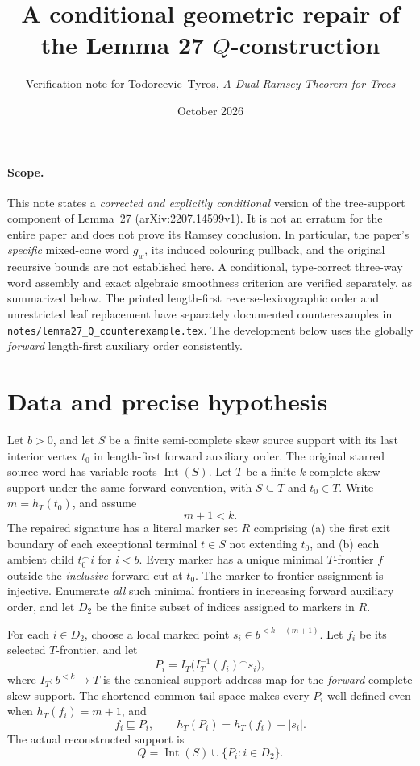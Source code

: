 \documentclass[11pt]{article}
\title{A conditional geometric repair of the Lemma 27 \(Q\)-construction}
\author{Verification note for Todorcevic--Tyros,
\emph{A Dual Ramsey Theorem for Trees}}
\date{October 2026}
\newcommand{\Int}{\operatorname{Int}}
\newcommand{\htT}{h_T}
\newcommand{\pre}{\sqsubseteq}
\newcommand{\len}[1]{\lvert #1\rvert}
\begin{document}
\maketitle

\paragraph{Scope.}
This note states a \emph{corrected and explicitly conditional}
version of the tree-support component of Lemma~27
(arXiv:2207.14599v1).
It is not an erratum for the entire paper and does not
prove its Ramsey conclusion. In particular, the paper's
\emph{specific} mixed-cone word \(g_w\), its induced
colouring pullback, and the original recursive bounds
are not established here. A conditional, type-correct
three-way word assembly and exact algebraic smoothness
criterion are verified separately, as summarized below.
The printed length-first reverse-lexicographic order and
unrestricted leaf replacement have separately documented
counterexamples in
\texttt{notes/lemma27\_Q\_counterexample.tex}.
The development below uses the globally \emph{forward}
length-first auxiliary order consistently.

\section*{Data and precise hypothesis}

Let \(b>0\), and let \(S\) be a finite semi-complete skew
source support with its last interior vertex \(t_0\)
in length-first forward auxiliary order.
The original starred source word has variable roots
\(\Int(S)\).
Let \(T\) be a finite \(k\)-complete skew support under
the same forward convention, with \(S\subseteq T\) and
\(t_0\in T\).
Write \(m=\htT(t_0)\), and assume
\begin{equation}\label{eq:early}
 m+1<k.
\end{equation}
The repaired signature has a literal marker set \(R\)
comprising (a) the first exit boundary of each exceptional
terminal \(t\in S\) not extending \(t_0\), and (b) each
ambient child \(t_0^\frown i\) for \(i<b\).
Every marker has a unique minimal \(T\)-frontier \(f\)
outside the \emph{inclusive} forward cut at \(t_0\).
The marker-to-frontier assignment is injective.
Enumerate \emph{all} such minimal frontiers in increasing
forward auxiliary order, and let \(D_2\) be the finite
subset of indices assigned to markers in \(R\).

For each \(i\in D_2\), choose a local marked point
\(s_i\in b^{<k-(m+1)}\). Let \(f_i\) be its selected
\(T\)-frontier, and let
\[
 P_i=I_T\bigl(I_T^{-1}(f_i)^\frown s_i\bigr),
\]
where \(I_T:b^{<k}\to T\) is the canonical
support-address map for the \emph{forward} complete
skew support.
The shortened common tail space makes every \(P_i\)
well-defined even when \(\htT(f_i)=m+1\), and
\begin{equation}\label{eq:projectrank}
 f_i\pre P_i,\qquad
 \htT(P_i)=\htT(f_i)+\len{s_i}.
\end{equation}
The actual reconstructed support is
\[
 Q=\Int(S)\cup\{P_i:i\in D_2\}.
\]
\end{document}
